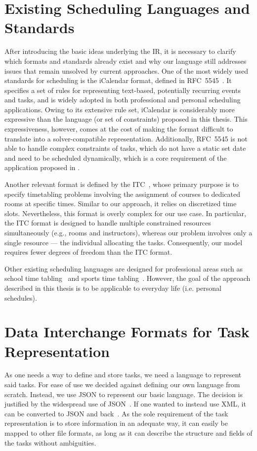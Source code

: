 \section{Existing Scheduling Languages and Standards}
\label{sec:preliminaries-related-work:existing-scheduling-languages-and-standards}
After introducing the basic ideas underlying the \ac{IR}, it is necessary to clarify which formats and standards already exist and why our language still addresses issues that remain unsolved by current approaches. One of the most widely used standards for scheduling is the iCalendar format, defined in RFC~5545~\cite{bib:rfc5545}. It specifies a set of rules for representing text-based, potentially recurring events and tasks, and is widely adopted in both professional and personal scheduling applications. Owing to its extensive rule set, iCalendar is considerably more expressive than the language (or set of constraints) proposed in this thesis. This expressiveness, however, comes at the cost of making the format difficult to translate into a solver-compatible representation. Additionally, RFC~5545 is not able to handle complex constraints of tasks, which do not have a static set date and need to be scheduled dynamically, which is a core requirement of the application proposed in .

Another relevant format is defined by the \ac{ITC}~\cite{bib:itc2019format}, whose primary purpose is to specify timetabling problems involving the assignment of courses to dedicated rooms at specific times. Similar to our approach, it relies on discretized time slots. Nevertheless, this format is overly complex for our use case. In particular, the \ac{ITC} format is designed to handle multiple constrained resources simultaneously (e.g., rooms and instructors), whereas our problem involves only a single resource --- the individual allocating the tasks. Consequently, our model requires fewer degrees of freedom than the \ac{ITC} format.

Other existing scheduling languages are designed for professional areas such as school time tabling~\cite{bib:2017-dmirovic} and sports time tabling~\cite{bib:2022-lester}. However, the goal of the approach described in this thesis is to be applicable to everyday life (i.e. personal schedules).

\section{Data Interchange Formats for Task Representation}
As one needs a way to define and store tasks, we need a language to represent said tasks. For ease of use we decided against defining our own language from scratch. Instead, we use \ac{JSON} to represent our basic language. The decision is justified by the widespread use of \ac{JSON}~\cite{bib:2020-bourhis}. If one wanted to instead use \ac{XML}, it can be converted to \ac{JSON} and back~\cite{bib:2017-LaFontaine}. As the sole requirement of the task representation is to store information in an adequate way, it can easily be mapped to other file formats, as long as it can describe the structure and fields of the tasks without ambiguities.

